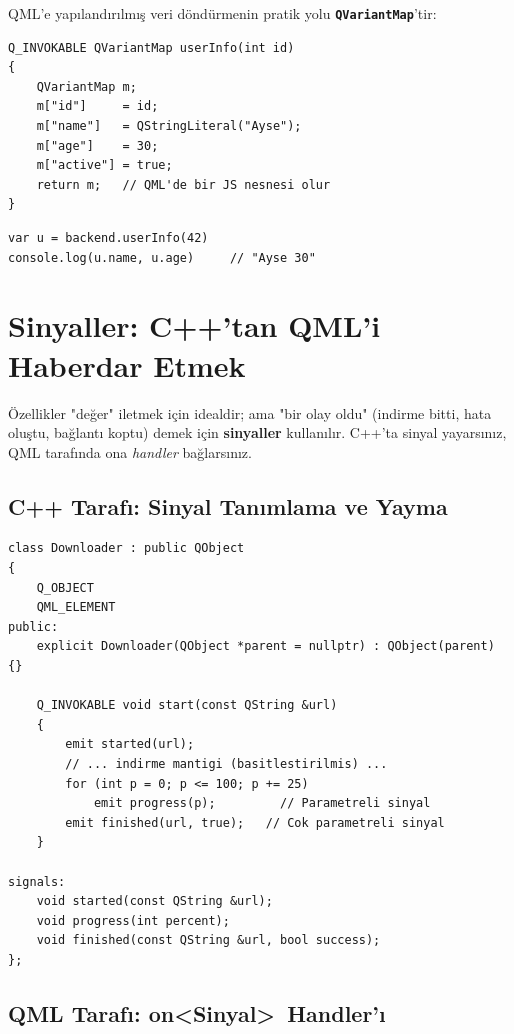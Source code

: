 \documentclass[11pt,a4paper]{article}
\newcommand{\kls}[1]{\texttt{\color{anaMavi}\textbf{#1}}}
\begin{document}
QML'e yapılandırılmış veri döndürmenin pratik yolu \kls{QVariantMap}'tir:

\begin{lstlisting}
Q_INVOKABLE QVariantMap userInfo(int id)
{
    QVariantMap m;
    m["id"]     = id;
    m["name"]   = QStringLiteral("Ayse");
    m["age"]    = 30;
    m["active"] = true;
    return m;   // QML'de bir JS nesnesi olur
}
\end{lstlisting}

\begin{lstlisting}[style=qmlstyle]
var u = backend.userInfo(42)
console.log(u.name, u.age)     // "Ayse 30"
\end{lstlisting}

\section{Sinyaller: C++'tan QML'i Haberdar Etmek}

Özellikler "değer" iletmek için idealdir; ama "bir olay oldu" (indirme bitti,
hata oluştu, bağlantı koptu) demek için \textbf{sinyaller} kullanılır. C++'ta
sinyal yayarsınız, QML tarafında ona \emph{handler} bağlarsınız.

\subsection{C++ Tarafı: Sinyal Tanımlama ve Yayma}

\begin{lstlisting}
class Downloader : public QObject
{
    Q_OBJECT
    QML_ELEMENT
public:
    explicit Downloader(QObject *parent = nullptr) : QObject(parent) {}

    Q_INVOKABLE void start(const QString &url)
    {
        emit started(url);
        // ... indirme mantigi (basitlestirilmis) ...
        for (int p = 0; p <= 100; p += 25)
            emit progress(p);         // Parametreli sinyal
        emit finished(url, true);   // Cok parametreli sinyal
    }

signals:
    void started(const QString &url);
    void progress(int percent);
    void finished(const QString &url, bool success);
};
\end{lstlisting}

\subsection{QML Tarafı: on\textless Sinyal\textgreater\ Handler'ı}
\end{document}
